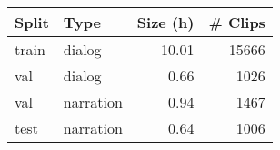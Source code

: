 \begin{tabular}{llrr}
\toprule
Split &      Type &  Size (h) &  \# Clips \\
\midrule
train &    dialog &     10.01 &    15666 \\
  val &    dialog &      0.66 &     1026 \\
  val & narration &      0.94 &     1467 \\
 test & narration &      0.64 &     1006 \\
\bottomrule
\end{tabular}

